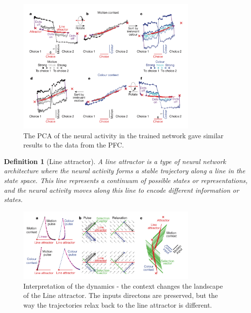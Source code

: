 \documentclass[11pt]{book} %
\newtheorem{definition}{Definition}[section]
\begin{document}
\begin{figure}[h]
    \centering
    \includegraphics[width=0.8\textwidth]{./Figs/PFC6.jpeg}
    \caption{The PCA of the neural activity in the trained network gave similar results to the data from the PFC.}
    \label{fig:PFC_NN_results}
\end{figure}

\begin{definition}[Line attractor]
    A line attractor is a type of neural network architecture where the neural activity forms a stable trajectory along a line in the state space. 
    This line represents a continuum of possible states or representations, and the neural activity moves along this line to encode different information or states.     
\end{definition}

\begin{figure}[h]
    \centering
    \includegraphics[width=0.8\textwidth]{./Figs/PFC7.jpeg}
    \caption{Interpretation of the dynamics - the context changes the landscape of the Line attractor. 
    The inputs directons are preserved, but the way the trajectories relax back to the line attractor is different.}
    \label{fig:PFC_NN_explained}
\end{figure}
\end{document}
